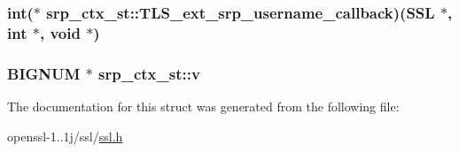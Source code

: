 \hypertarget{structsrp__ctx__st_a5bf5815ad8a3bd9aa1c84782324286a9}{
\subsubsection[{T\-L\-S\-\_\-ext\-\_\-srp\-\_\-username\-\_\-callback}]{\setlength{\rightskip}{0pt plus 5cm}int($\ast$ srp\-\_\-ctx\-\_\-st\-::\-T\-L\-S\-\_\-ext\-\_\-srp\-\_\-username\-\_\-callback)(S\-S\-L $\ast$, int $\ast$, void $\ast$)}}\label{structsrp__ctx__st_a5bf5815ad8a3bd9aa1c84782324286a9}
\hypertarget{structsrp__ctx__st_a822ab1c65a312a2baefa2c5f35d48ab4}{
\subsubsection[{v}]{\setlength{\rightskip}{0pt plus 5cm}B\-I\-G\-N\-U\-M $\ast$ srp\-\_\-ctx\-\_\-st\-::v}}\label{structsrp__ctx__st_a822ab1c65a312a2baefa2c5f35d48ab4}


The documentation for this struct was generated from the following file\-:\begin{DoxyCompactItemize}
\item 
openssl-\/1..\-1j/ssl/\hyperlink{ssl_8h}{ssl.\-h}\end{DoxyCompactItemize}
